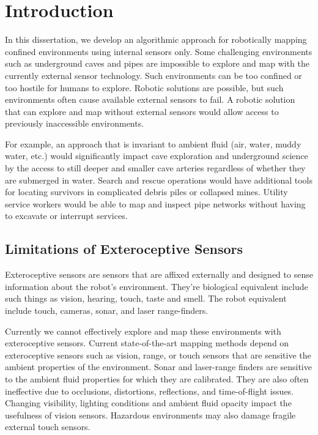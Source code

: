 
\def\mytitle{Exploring and Mapping Confined and Sensor-Challenged Environments with Proprioception of an Articulated Mobile Robot}
\def\myauthor{Jacob Everist}
\def\bibliocommand{}

\chapter{Introduction}
\label{introduction}

In this dissertation, we develop an algorithmic approach for robotically mapping confined environments using internal sensors only. Some challenging environments such as underground caves and pipes are impossible to explore and map with the currently external sensor technology. Such environments can be too confined or too hostile for humans to explore. Robotic solutions are possible, but such environments often cause available external sensors to fail. A robotic solution that can explore and map without external sensors would allow access to previously inaccessible environments. 

For example, an approach that is invariant to ambient fluid (air, water, muddy water, etc.) would significantly impact cave exploration and underground science by the access to still deeper and smaller cave arteries regardless of whether they are submerged in water. Search and rescue operations would have additional tools for locating survivors in complicated debris piles or collapsed mines. Utility service workers would be able to map and inspect pipe networks without having to excavate or interrupt services.

\section{Limitations of Exteroceptive Sensors}
\label{limitationsofexteroceptivesensors}

Exteroceptive sensors are sensors that are affixed externally and designed to sense information about the robot’s environment. They’re biological equivalent include such things as vision, hearing, touch, taste and smell. The robot equivalent include touch, cameras, sonar, and laser range-finders.

Currently we cannot effectively explore and map these environments with exteroceptive sensors. Current state-of-the-art mapping methods depend on exteroceptive sensors such as vision, range, or touch sensors that are sensitive the ambient properties of the environment. Sonar and laser-range finders are sensitive to the ambient fluid properties for which they are calibrated. They are also often ineffective due to occlusions, distortions, reflections, and time-of-flight issues. Changing visibility, lighting conditions and ambient fluid opacity impact the usefulness of vision sensors. Hazardous environments may also damage fragile external touch sensors.

